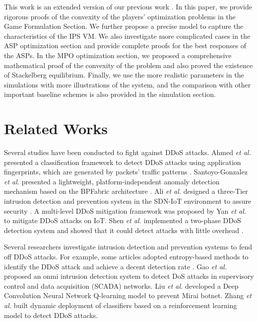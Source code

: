 \documentclass[10pt,journal, compsoc]{IEEEtran}
\begin{document}
This work is an extended version of our previous work \cite{Chang2}. In this paper, we provide rigorous proofs of the convexity of the players' optimization problems in the Game Formulation Section. We further propose a precise model to capture the characteristics of the IPS VM. We  also investigate more complicated cases in the ASP optimization section and provide complete proofs for the best responses of the ASPs. In the MPO optimization section, we proposed a comprehensive mathematical proof of the convexity of the problem and also proved the existence of Stackelberg equilibrium. Finally, we use the more realistic parameters in the simulations with more illustrations of the system, and the comparison with other important baseline schemes is also provided in the simulation section.

\section{Related Works}

Several studies have been conducted to fight against DDoS attacks. Ahmed \emph{et al.} presented a classification framework to detect DDoS attacks using application fingerprints, which are generated by packets' traffic patterns \cite{Ahmed}. Santoyo-Gonzalez \emph{et al.} presented a lightweight, platform-independent anomaly detection mechanism based on the BPFabric architecture \cite{Santoyo-Gonzalez}. Ali \emph{et al.} designed a three-Tier intrusion detection and prevention system in the SDN-IoT environment to assure security \cite{Ali}. A multi-level DDoS mitigation framework \cite{Yan} was proposed by Yan \emph{et al.} to mitigate DDoS attacks on IoT. Shen \emph{et al.} implemented a two-phase DDoS detection system and showed that it could detect attacks with little overhead \cite{Shen}.


Several researchers investigate intrusion detection and prevention systems to fend off DDoS attacks. For example, some articles adopted entropy-based methods to identify the DDoS attack and achieve a decent detection rate \cite{Kalkan}\cite{Tsobdjou}. Gao \emph{et al.} proposed an onmi intrusion detection system to detect DoS attacks in supervisory control and data acquisition (SCADA) networks\cite{Gao}. Liu \emph{et al.} developed a Deep Convolution Neural Network Q-learning model to prevent Mirai botnet\cite{Liu}. Zhang \emph{et al.} built dynamic deployment of classifiers based on a reinforcement learning model to detect DDoS attacks\cite{Zhang}.
\end{document}

